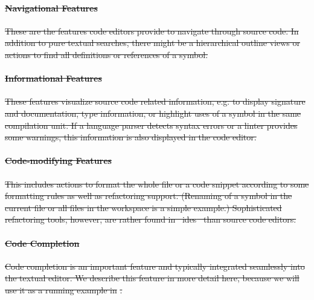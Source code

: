 \documentclass[sigplan,10pt,review,anonymous]{acmart}
\providecommand{\DIFdel}[1]{{\protect\color{red}\sout{#1}}}                      %
\begin{document}
\paragraph{\DIFdel{Navigational Features}}
\addtocounter{paragraph}{-1}%
\DIFdel{These are the features code editors provide to navigate through source code. In
addition to pure textual searches, there might be a hierarchical outline views
or actions to find all definitions or references of a symbol.
}%

\paragraph{\DIFdel{Informational Features}}
\addtocounter{paragraph}{-1}%
\DIFdel{These features visualize source code related information, e.g. to display
signature and documentation, type information, or highlight uses of a symbol in
the same compilation unit. If a language parser detects syntax errors or a
linter provides some warnings, this information is also displayed in the code
editor.
}%

\paragraph{\DIFdel{Code-modifying Features}}
\addtocounter{paragraph}{-1}%
\DIFdel{This includes actions to format the whole file or a code snippet according to
some formatting rules as well as refactoring support. (Renaming of a symbol in
the current file or all files in the workspace is a simple example.)
Sophisticated refactoring tools, however, are rather found in \mbox{%
\acp{ide} }\hspace{0pt}%
than
source code editors.
}%

\paragraph{\DIFdel{Code Completion}}
\addtocounter{paragraph}{-1}%
\DIFdel{Code completion is an important feature and typically integrated seamlessly into
the textual editor. We describe this feature in more detail here, because we will use it as a running example in }%
\DIFdel{.
}%
\end{document}
